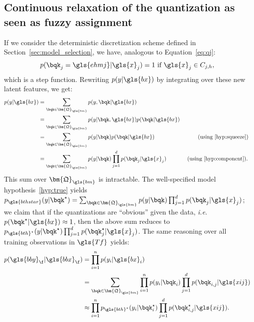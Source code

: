 \subsection{Continuous relaxation of the quantization as seen as fuzzy assignment} \label{subsec:fuzzy}

If we consider the deterministic discretization scheme defined in Section~\ref{sec:model_selection}, we have, analogous to Equation~\eqref{eq:qj}:
$$
p(\bqk_j = \gls{ehmj} | \gls{x}_j) = 1 \text{ if } \gls{x}_j \in C_{j,h},
$$
which is a step function. Rewriting $p(y| \gls{bx})$ by integrating over these new latent features,
we get:
\begin{align*}
p(y | \gls{bx}) & = \sum_{\bqk \in \bm{\mathfrak{Q}}_{\gls{bm}}} p(y, \bqk | \gls{bx}) \\
& = \sum_{\bqk \in \bm{\mathfrak{Q}}_{\gls{bm}}} p(y | \bqk, \gls{bx}) p(\bqk | \gls{bx}) \\
& = \sum_{\bqk \in \bm{\mathfrak{Q}}_{\gls{bm}}} p(y | \bqk) p(\bqk | \gls{bx}) & \text{ (using \eqref{hyp:squeeze}) } \\
& = \sum_{\bqk \in \bm{\mathfrak{Q}}_{\gls{bm}}} p(y | \bqk) \prod_{j=1}^d p(\bqk_j | \gls{x}_j) & \text{ (using \eqref{hyp:component}). }
\end{align*}
This sum over $\bm{\mathfrak{Q}}_{\gls{bm}}$ is intractable.
The well-specified model hypothesis~\eqref{hyp:true} yields $p_{\gls{bthstar}}(y | \bqk^\star) = \sum_{\bqk \in \bm{\mathfrak{Q}}_{\gls{bm}}} p(y | \bqk) \prod_{j=1}^d p(\bqk_j | \gls{x}_j)$; we claim that if the quantizations are ``obvious'' given the data, \textit{i.e.}\ $p(\bqk^\star | \gls{bx}) \approx 1$, then the above sum reduces to $p_{\gls{bth}^\star}(y | \bqk^\star) \prod_{j=1}^d p(\bqk_j^\star | \gls{x}_j)$. The same reasoning over all training observations in $\gls{Tf}$ yields:
\begin{align*}
p(\gls{bby}_\f | \gls{bbx}_\f) & = \prod_{i=1}^n p(y_i | \gls{bx}_i) \\
 & = \sum_{\bqk \in \bm{\mathfrak{Q}}_{\gls{bm}}} \prod_{i=1}^n p(y_i | \bqk_i) \prod_{j=1}^d p(\bqk_{i,j} | \gls{xij}) \\
 & \approx \prod_{i=1}^n p_{\gls{bth}^\star}(y_i | \bqk_i^\star) \prod_{j=1}^d p(\bqk_{i,j}^\star | \gls{xij}).
\end{align*}
